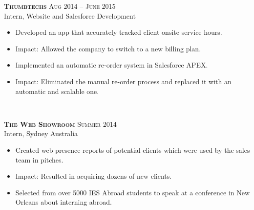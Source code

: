 \documentclass[10pt]{article} %
\begin{document}
{\raggedright

\large \textsc{\textbf{Thumbtechs}} \hfill \small{\textsc{Aug 2014 -- June 2015}}\\
Intern, Website and Salesforce Development}
\normalsize{
\begin{itemize}
\item Developed an app that accurately tracked client onsite service hours.
\item Impact: Allowed the company to switch to a new billing plan.
\item Implemented an automatic re-order system in Salesforce APEX.
\item Impact: Eliminated the manual re-order process and replaced it with an automatic and scalable one.
\end{itemize}
}\\
\hfill

{\raggedright \large \textsc{\textbf{The Web Showroom}} \hfill \small{\textsc{Summer 2014}}\\
Intern, Sydney Australia}
\normalsize{
\begin{itemize}
\item Created web presence reports of potential clients which were used by the sales team in pitches.
\item Impact: Resulted in acquiring dozens of new clients.
\item Selected from over 5000 IES Abroad students to speak at a conference in New Orleans about interning abroad.
\end{itemize}
}\\
\hfill

\end{document}
